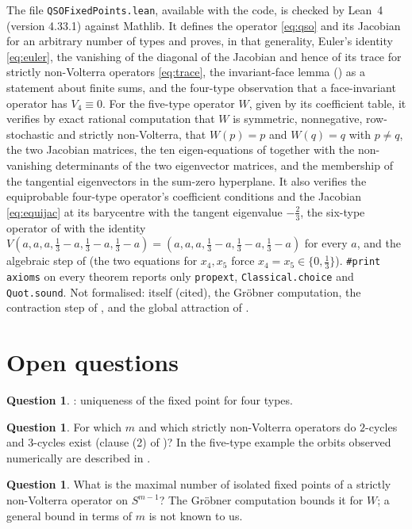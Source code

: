 \documentclass[11pt]{amsart}
\theoremstyle{definition}
\newtheorem{question}[theorem]{Question}
\newcommand{\Simp}{S^{m-1}}
\begin{document}
The file \texttt{QSOFixedPoints.lean}, available with the code, is checked by Lean~4 (version 4.33.1) against Mathlib. It defines the operator \eqref{eq:qso} and its Jacobian for an arbitrary number of types and proves, in that generality, Euler's identity \eqref{eq:euler}, the vanishing of the diagonal of the Jacobian and hence of its trace for strictly non-Volterra operators \eqref{eq:trace}, the invariant-face lemma () as a statement about finite sums, and the four-type observation that a face-invariant operator has $V_4\equiv0$. For the five-type operator $W$, given by its coefficient table, it verifies by exact rational computation that $W$ is symmetric, nonnegative, row-stochastic and strictly non-Volterra, that $W(p)=p$ and $W(q)=q$ with $p\ne q$, the two Jacobian matrices, the ten eigen-equations of  together with the non-vanishing determinants of the two eigenvector matrices, and the membership of the tangential eigenvectors in the sum-zero hyperplane. It also verifies the equiprobable four-type operator's coefficient conditions and the Jacobian \eqref{eq:equijac} at its barycentre with the tangent eigenvalue $-\frac23$, the six-type operator of  with the identity $V(a,a,a,\frac13-a,\frac13-a,\frac13-a)=(a,a,a,\frac13-a,\frac13-a,\frac13-a)$ for every $a$, and the algebraic step of  (the two equations for $x_4,x_5$ force $x_4=x_5\in\{0,\frac13\}$). \texttt{\#print axioms} on every theorem reports only \texttt{propext}, \texttt{Classical.choice} and \texttt{Quot.sound}. Not formalised:  itself (cited), the Gr\"obner computation, the contraction step of , and the global attraction of .

\section{Open questions}

\begin{question}
: uniqueness of the fixed point for four types.
\end{question}

\begin{question}
For which $m$ and which strictly non-Volterra operators do $2$-cycles and $3$-cycles exist (clause (2) of )? In the five-type example the orbits observed numerically are described in .
\end{question}

\begin{question}
What is the maximal number of isolated fixed points of a strictly non-Volterra operator on $\Simp$? The Gr\"obner computation bounds it for $W$; a general bound in terms of $m$ is not known to us.
\end{question}
\end{document}
